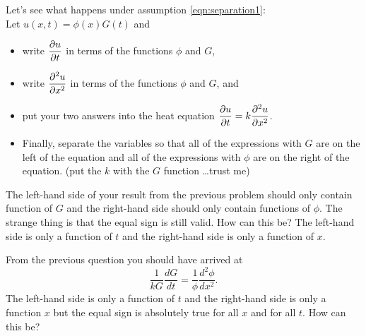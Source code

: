 \begin{problem}
    Let's see what happens under assumption \eqref{eqn:separation1}:\\ Let $u(x,t) =
    \phi(x) G(t)$ and 
    \begin{itemize}
        \item write $\displaystyle \frac{\partial u}{\partial t}$ in terms of the functions $\phi$ and $G$,
        \item write $\displaystyle \frac{\partial^2 u}{\partial x^2}$ in terms of the functions $\phi$ and $G$,
            and 
        \item put your two answers into the heat equation $\displaystyle \frac{\partial u}{\partial t} = k
            \frac{\partial^2 u}{\partial x^2}$.
        \item Finally, separate the variables so that all of the expressions with $G$ are
            on the left of the equation and all of the expressions with $\phi$ are on the
            right of the equation. (put the $k$ with the $G$ function \dots trust me)
    \end{itemize}
\end{problem}

The left-hand side of your result from the previous problem should only contain function
of $G$ and the right-hand side should only contain functions of $\phi$.  The strange thing
is that the equal sign is still valid.  How can this be?  The left-hand side is only a function
of $t$ and the right-hand side is only a function of $x$.
\begin{problem}
    From the previous question you should have arrived at
    \[ \frac{1}{kG} \frac{dG}{dt} = \frac{1}{\phi} \frac{d^2 \phi}{dx^2}. \]
    The left-hand side is only a function of $t$ and the right-hand side is only a
    function $x$ but the equal sign is absolutely true for all $x$ and for all $t$.  How
    can this be?
\end{problem}

